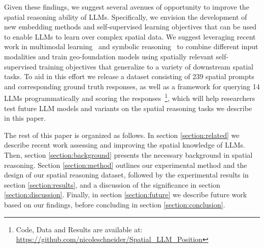 Given these findings, we suggest several avenues of opportunity to improve the spatial reasoning ability of LLMs.
Specifically, we envision the development of new embedding methods and self-supervised learning objectives that can be used to enable LLMs to learn over complex spatial data.
We suggest leveraging recent work in multimodal learning~\cite{Xue2023, Trappolini2023} and symbolic reasoning~\cite{Lee2023} to combine different input modalities and train geo-foundation models using spatially relevant self-supervised training objectives that generalize to a variety of downstream spatial tasks.
To aid in this effort we release a dataset consisting of 239  spatial prompts and corresponding ground truth responses, as well as a framework for querying 14 LLMs programmatically and scoring the responses~\footnote{Code, Data and Results are available at: \url{https://github.com/nicoleschneider/Spatial_LLM_Position}}, which will help researchers test future LLM models and variants on the spatial reasoning tasks we describe in this paper. 



The rest of this paper is organized as follows.
In section \ref{section:related} we describe recent work assessing and improving the spatial knowledge of LLMs.
Then, section \ref{section:background} presents the necessary background in spatial reasoning.
Section \ref{section:method} outlines our experimental method and the design of our spatial reasoning dataset, followed by the experimental results in section \ref{section:results}, and a discussion of the significance in section \ref{section:discussion}.
Finally, in section \ref{section:future} we describe future work based on our findings, before concluding in section \ref{section:conclusion}. 




